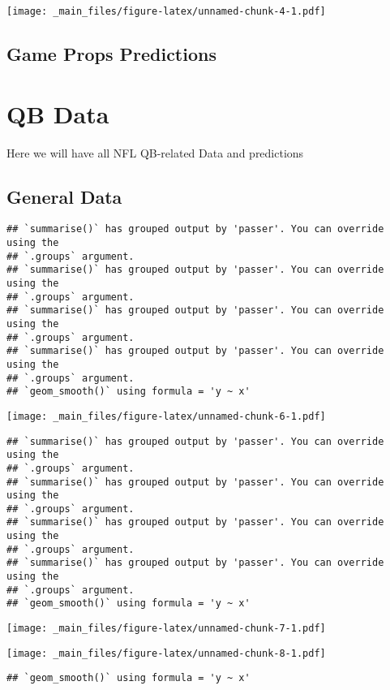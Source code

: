 \documentclass[
]{article}
\begin{document}
\texttt{[image: \_main\_files/figure-latex/unnamed-chunk-4-1.pdf]}

\hypertarget{game-props-predictions}{%
\subsection{Game Props Predictions}\label{game-props-predictions}}

\hypertarget{qb-data}{%
\section{QB Data}\label{qb-data}}

Here we will have all NFL QB-related Data and predictions

\hypertarget{general-data}{%
\subsection{General Data}\label{general-data}}

\begin{verbatim}
## `summarise()` has grouped output by 'passer'. You can override using the
## `.groups` argument.
## `summarise()` has grouped output by 'passer'. You can override using the
## `.groups` argument.
## `summarise()` has grouped output by 'passer'. You can override using the
## `.groups` argument.
## `summarise()` has grouped output by 'passer'. You can override using the
## `.groups` argument.
## `geom_smooth()` using formula = 'y ~ x'
\end{verbatim}

\texttt{[image: \_main\_files/figure-latex/unnamed-chunk-6-1.pdf]}

\begin{verbatim}
## `summarise()` has grouped output by 'passer'. You can override using the
## `.groups` argument.
## `summarise()` has grouped output by 'passer'. You can override using the
## `.groups` argument.
## `summarise()` has grouped output by 'passer'. You can override using the
## `.groups` argument.
## `summarise()` has grouped output by 'passer'. You can override using the
## `.groups` argument.
## `geom_smooth()` using formula = 'y ~ x'
\end{verbatim}

\texttt{[image: \_main\_files/figure-latex/unnamed-chunk-7-1.pdf]}

\texttt{[image: \_main\_files/figure-latex/unnamed-chunk-8-1.pdf]}

\begin{verbatim}
## `geom_smooth()` using formula = 'y ~ x'
\end{verbatim}
\end{document}
